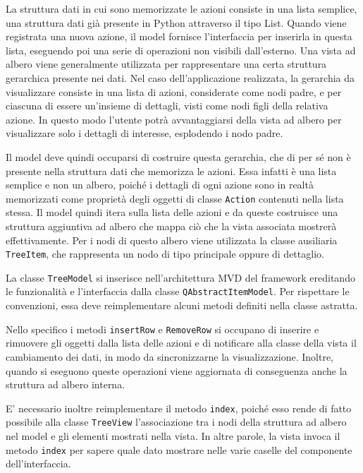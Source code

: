 \documentclass[12pt]{toptesi}
\begin{document}
La struttura dati in cui sono memorizzate le azioni consiste in una lista semplice, una struttura dati già presente in Python attraverso il tipo List. Quando viene registrata una nuova azione, il model fornisce l'interfaccia per inserirla in questa lista, eseguendo poi una serie di operazioni non visibili dall'esterno. Una vista ad albero viene generalmente utilizzata per rappresentare una certa struttura gerarchica presente nei dati. Nel caso dell'applicazione realizzata, la gerarchia da visualizzare consiste in una lista di azioni, considerate come nodi padre, e per ciascuna di essere un'insieme di dettagli, visti come nodi figli della relativa azione. In questo modo l'utente potrà avvantaggiarsi della vista ad albero per visualizzare solo i dettagli di interesse, esplodendo i nodo padre.

Il model deve quindi occuparsi di costruire questa gerarchia, che di per sé non è presente nella struttura dati che memorizza le azioni. Essa infatti è una lista semplice e non un albero, poiché i dettagli di ogni azione sono in realtà memorizzati come proprietà degli oggetti di classe \verb|Action| contenuti nella lista stessa. Il model quindi itera sulla lista delle azioni e da queste costruisce una struttura aggiuntiva ad albero che mappa ciò che la vista associata mostrerà effettivamente. Per i nodi di questo albero viene utilizzata la classe ausiliaria \verb|TreeItem|, che rappresenta un nodo di tipo principale oppure di dettaglio.

La classe \verb|TreeModel| si inserisce nell'architettura MVD del framework ereditando le funzionalità e l'interfaccia dalla classe \verb|QAbstractItemModel|. Per rispettare le convenzioni, essa deve reimplementare alcuni metodi definiti nella classe astratta. 

Nello specifico i metodi \verb|insertRow| e \verb|RemoveRow| si occupano di inserire e rimuovere gli oggetti dalla lista delle azioni e di notificare alla classe della vista il cambiamento dei dati, in modo da sincronizzarne la visualizzazione. Inoltre, quando si eseguono queste operazioni viene aggiornata di conseguenza anche la struttura ad albero interna.

 

E' necessario inoltre reimplementare il metodo \verb|index|, poiché esso rende di fatto possibile alla classe \verb|TreeView| l'associazione tra i nodi della struttura ad albero nel model e gli elementi mostrati nella vista. In altre parole, la vista invoca il metodo \verb|index| per sapere quale dato mostrare nelle varie caselle del componente dell'interfaccia.
\end{document}
